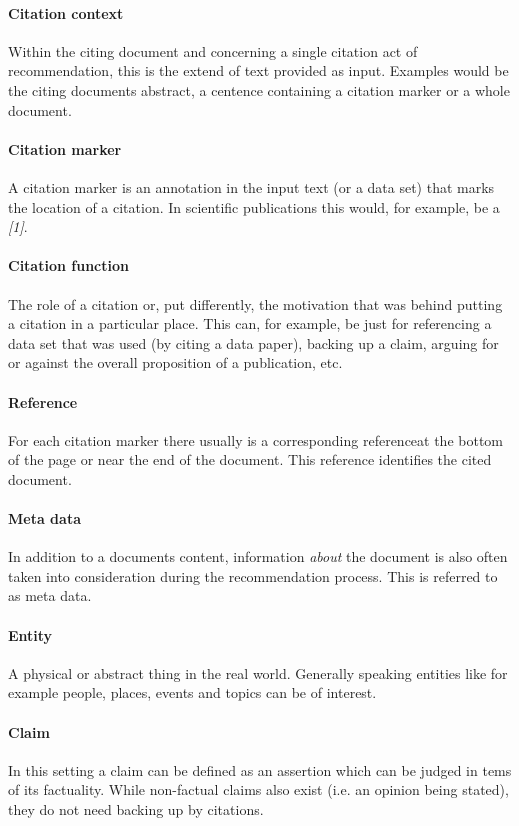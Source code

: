\documentclass{proseminar}
\begin{document}
\paragraph{Citation context}
Within the citing document and concerning a single citation act of recommendation, this is the extend of text provided as input. Examples would be the citing documents abstract, a centence containing a citation marker or a whole document.

\paragraph{Citation marker}
A citation marker is an annotation in the input text (or a data set) that marks the location of a citation. In scientific publications this would, for example, be a \emph{[1]}.

\paragraph{Citation function}
The role of a citation or, put differently, the motivation that was behind putting a citation in a particular place. This can, for example, be just for referencing a data set that was used (by citing a data paper), backing up a claim, arguing for or against the overall proposition of a publication, etc.

\paragraph{Reference}
For each citation marker there usually is a corresponding referenceat the bottom of the page or near the end of the document. This reference identifies the cited document.

\paragraph{Meta data}
In addition to a documents content, information \emph{about} the document is also often taken into consideration during the recommendation process. This is referred to as meta data.

\paragraph{Entity}
A physical or abstract thing in the real world. Generally speaking entities like for example people, places, events and topics can be of interest.

\paragraph{Claim}
In this setting a claim can be defined as an assertion which can be judged in tems of its factuality. While non-factual claims also exist (i.e. an opinion being stated), they do not need backing up by citations.
\end{document}
